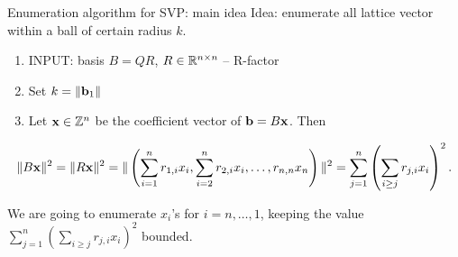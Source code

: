 \documentclass[usenames,dvipsnames, 9pt, aspectratio=169]{beamer}
\begin{document}
\begin{frame}{Enumeration algorithm for SVP: main idea}
\Large
{\color{Orange} Idea:} enumerate all lattice vector within a ball of certain radius $k$.

\begin{enumerate}
	\item INPUT: basis $B = QR$, $R \in {{\mathbb R}}^{n \times n}$ -- R-factor
	\item Set $k = \| \mathbf{b}_1 \|$
	\item Let $\mathbf{x} \in {{\mathbb Z}}^n$ be the coefficient vector of $\mathbf{b} = B\mathbf{x}$. Then
\end{enumerate}
\begin{align*}\label{eq:enum_norm}
\| B\mathbf{x} \|^2   = \| R\mathbf{x} \|^2 = \| \left( \sum_{i=1}^n r_{1,i}x_i, \sum_{i=2}^n r_{2,i}x_i, \ldots, r_{n,n} x_n \right) \|^2 
 = \sum_{j=1}^n \left( \sum_{i \geq j} r_{j,i} x_i \right)^2.
\end{align*}

We are going to enumerate $x_i$'s for $i = n, \ldots, 1$, keeping the value $\sum_{j=1}^n \left( \sum_{i \geq j} r_{j,i} x_i \right)^2$ bounded.

\end{frame}
\end{document}
